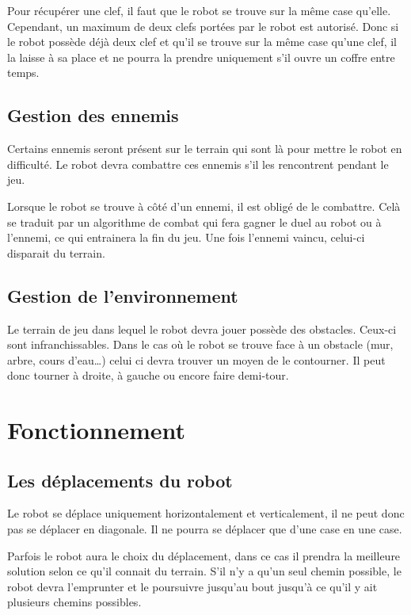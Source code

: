 \documentclass[a4paper 12pts]{article}
\begin{document}
Pour récupérer une clef, il faut que le robot se trouve sur la même case qu'elle. Cependant, un maximum de deux clefs portées par le robot est autorisé. Donc si le robot possède déjà deux clef et qu'il se trouve sur la même case qu'une clef, il la laisse à sa place et ne pourra la prendre uniquement s'il ouvre un coffre entre temps.

\subsection{Gestion des ennemis}
Certains ennemis seront présent sur le terrain qui sont là pour mettre le robot en difficulté. Le robot devra combattre ces ennemis s'il les rencontrent pendant le jeu.

Lorsque le robot se trouve à côté d'un ennemi, il est obligé de le combattre. Celà se traduit par un algorithme de combat qui fera gagner le duel au robot ou à l'ennemi, ce qui entrainera la fin du jeu. Une fois l'ennemi vaincu, celui-ci disparait du terrain.

\subsection{Gestion de l'environnement}
Le terrain de jeu dans lequel le robot devra jouer possède des obstacles. Ceux-ci sont infranchissables. Dans le cas où le robot se trouve face à un obstacle (mur, arbre, cours d'eau\ldots) celui ci devra trouver un moyen de le contourner. Il peut donc tourner à droite, à gauche ou encore faire demi-tour.


\section{Fonctionnement}

\subsection{Les déplacements du robot}
Le robot se déplace uniquement horizontalement et verticalement, il ne peut donc pas se déplacer en diagonale. Il ne pourra se déplacer que d'une case en une case.

Parfois le robot aura le choix du déplacement, dans ce cas il prendra la meilleure solution selon ce qu'il connait du terrain. S'il n'y a qu'un seul chemin possible, le robot devra l'emprunter et le poursuivre jusqu'au bout jusqu'à ce qu'il y ait plusieurs chemins possibles.
\end{document}
